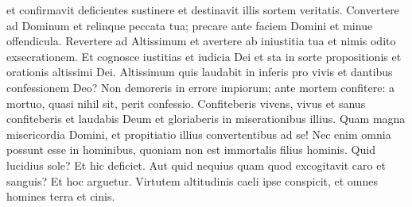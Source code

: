 \begin{biblechapter}
\begin{biblechapter}
\begin{biblechapter}
\begin{biblechapter}
\begin{biblechapter}
\begin{biblechapter}
\begin{biblechapter}
\begin{biblechapter}
\begin{biblechapter}
\begin{biblechapter}
\begin{biblechapter}
\begin{biblechapter}
\begin{biblechapter}
\begin{biblechapter}
\begin{biblechapter}
\begin{biblechapter}
\begin{biblechapter}
 et confirmavit deficientes sustinere
 et destinavit illis sortem veritatis.
 \verse Convertere ad Dominum et relinque peccata tua;
 \verse precare ante faciem Domini et minue offendicula.
 \verse Revertere ad Altissimum et avertere ab iniustitia tua
 et nimis odito exsecrationem.
 \verse Et cognosce iustitias et iudicia Dei
 et sta in sorte propositionis et orationis altissimi Dei.
 \verse Altissimum quis laudabit in inferis
 pro vivis et dantibus confessionem Deo?
 \verse Non demoreris in errore impiorum;
 ante mortem confitere:
 a mortuo, quasi nihil sit, perit confessio.
 \verse Confiteberis vivens, vivus et sanus confiteberis
 et laudabis Deum et gloriaberis in miserationibus illius.
 \verse Quam magna misericordia Domini,
 et propitiatio illius convertentibus ad se!
 \verse Nec enim omnia possunt esse in hominibus,
 quoniam non est immortalis filius hominis.
 \verse Quid lucidius sole? Et hic deficiet.
 Aut quid nequius quam quod excogitavit caro et sanguis?
 Et hoc arguetur.
 \verse Virtutem altitudinis caeli ipse conspicit,
 et omnes homines terra et cinis.
 

\end{biblechapter}
\end{biblechapter}
\end{biblechapter}
\end{biblechapter}
\end{biblechapter}
\end{biblechapter}
\end{biblechapter}
\end{biblechapter}
\end{biblechapter}
\end{biblechapter}
\end{biblechapter}
\end{biblechapter}
\end{biblechapter}
\end{biblechapter}
\end{biblechapter}
\end{biblechapter}
\end{biblechapter}
